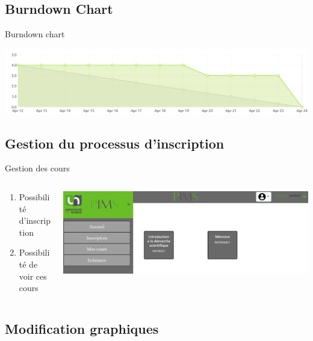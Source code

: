 \documentclass[numbering=fraction]{beamer}
\begin{document}
\subsection{Burndown Chart}
\begin{frame}{Burndown chart}
    \centering
    
    \includegraphics[width=1.1\textwidth]{burndownChart.png} 
\end{frame}

\subsection{Gestion du processus d'inscription}
\begin{frame}{Gestion des cours}
    \begin{columns}
        \begin{column}{0.5\textwidth}
            \begin{enumerate}
                \item Possibilité d'inscription
                \item Possibilité de voir ces cours
            \end{enumerate}
        \end{column}
        \begin{column}{0.5\textwidth}
            \includegraphics[width=\textwidth]{Gestion cours.png}
        \end{column}
    \end{columns}
\end{frame}
\subsection{Modification graphiques}
\end{document}
